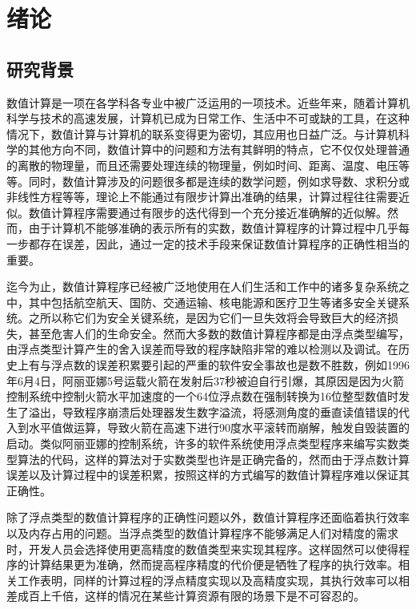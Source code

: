 \chapter{绪论}\label{chapter_introduction}

\section{研究背景}

数值计算\cite{rburden81:numerical}是一项在各学科各专业中被广泛运用的一项技术。近些年来，随着计算机科学与技术的高速发展，计算机已成为日常工作、生活中不可或缺的工具，在这种情况下，数值计算与计算机的联系变得更为密切，其应用也日益广泛。与计算机科学的其他方向不同，数值计算中的问题和方法有其鲜明的特点，它不仅仅处理普通的离散的物理量，而且还需要处理连续的物理量，例如时间、距离、温度、电压等等。同时，数值计算涉及的问题很多都是连续的数学问题，例如求导数、求积分或非线性方程等等，理论上不能通过有限步计算出准确的结果，计算过程往往需要近似。数值计算程序需要通过有限步的迭代得到一个充分接近准确解的近似解。然而，由于计算机不能够准确的表示所有的实数，数值计算程序的计算过程中几乎每一步都存在误差，因此，通过一定的技术手段来保证数值计算程序的正确性相当的重要。

迄今为止，数值计算程序已经被广泛地使用在人们生活和工作中的诸多复杂系统之中，其中包括航空航天、国防、交通运输、核电能源和医疗卫生等诸多安全关键系统。之所以称它们为安全关键系统，是因为它们一旦失效将会导致巨大的经济损失，甚至危害人们的生命安全。然而大多数的数值计算程序都是由浮点类型编写，由浮点类型计算产生的舍入误差而导致的程序缺陷非常的难以检测以及调试。在历史上有与浮点数的误差积累要引起的严重的软件安全事故也是数不胜数，例如1996年6月4日，阿丽亚娜5号运载火箭在发射后37秒被迫自行引爆\cite{lions1996ariane}，其原因是因为火箭控制系统中控制火箭水平加速度的一个64位浮点数在强制转换为16位整型数值时发生了溢出，导致程序崩溃后处理器发生数字溢流，将感测角度的垂直读值错误的代入到水平值做运算，导致火箭在高速下进行90度水平滚转而崩解，触发自毁装置的启动。类似阿丽亚娜的控制系统，许多的软件系统使用浮点类型程序来编写实数类型算法的代码，这样的算法对于实数类型也许是正确完备的，然而由于浮点数计算误差以及计算过程中的误差积累，按照这样的方式编写的数值计算程序难以保证其正确性。

除了浮点类型的数值计算程序的正确性问题以外，数值计算程序还面临着执行效率以及内存占用的问题。当浮点类型的数值计算程序不能够满足人们对精度的需求时，开发人员会选择使用更高精度的数值类型来实现其程序。这样固然可以使得程序的计算结果更为准确，然而提高程序精度的代价便是牺牲了程序的执行效率。相关工作表明，同样的计算过程的浮点精度实现以及高精度实现，其执行效率可以相差成百上千倍，这样的情况在某些计算资源有限的场景下是不可容忍的。

